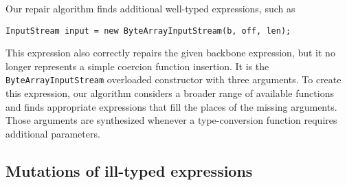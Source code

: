 Our repair algorithm finds additional well-typed expressions, such as 
\begin{lstlisting}    
InputStream input = new ByteArrayInputStream(b, off, len);
\end{lstlisting}
This expression also correctly
repairs the given backbone expression, but it no longer represents a simple coercion
function insertion. It is the \lstinline{ByteArrayInputStream} overloaded 
constructor with three arguments. To create this expression, our algorithm
considers a broader range of available functions and finds appropriate
expressions that fill the places of the missing arguments. Those arguments
are synthesized whenever a type-conversion function requires additional parameters.


\subsection{Mutations of ill-typed expressions}


